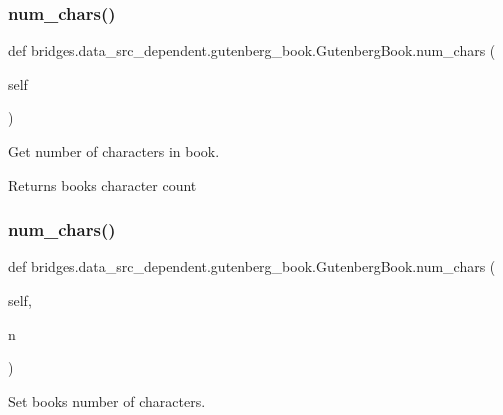 \subsubsection{\texorpdfstring{num\+\_\+chars()}{num\_chars()}\hspace{0.1cm}{\footnotesize\ttfamily [1/2]}}
{\footnotesize\ttfamily def bridges.\+data\+\_\+src\+\_\+dependent.\+gutenberg\+\_\+book.\+Gutenberg\+Book.\+num\+\_\+chars (\begin{DoxyParamCaption}\item[{}]{self }\end{DoxyParamCaption})}



Get number of characters in book. 

\begin{DoxyReturn}{Returns}
book\textquotesingle{}s character count 
\end{DoxyReturn}
\mbox{\label{classbridges_1_1data__src__dependent_1_1gutenberg__book_1_1_gutenberg_book_a825a9ca87358eb103a46ce5082a13490}} 
\subsubsection{\texorpdfstring{num\+\_\+chars()}{num\_chars()}\hspace{0.1cm}{\footnotesize\ttfamily [2/2]}}
{\footnotesize\ttfamily def bridges.\+data\+\_\+src\+\_\+dependent.\+gutenberg\+\_\+book.\+Gutenberg\+Book.\+num\+\_\+chars (\begin{DoxyParamCaption}\item[{}]{self,  }\item[{}]{n }\end{DoxyParamCaption})}



Set book\textquotesingle{}s number of characters. 


